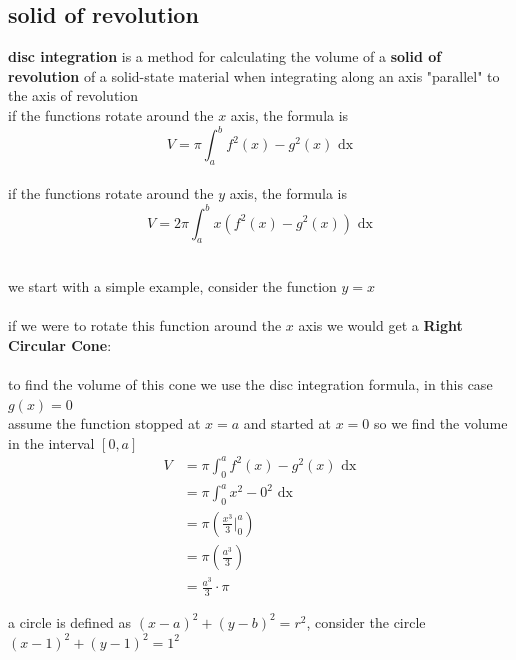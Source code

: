 \documentclass[a4paper,12pt]{article}
\newcommand{\?}{\stackrel{?}{=}}
\begin{document}
\subsection{solid of revolution}
\label{sec:org54164d2}
\begin{definition}
\textbf{disc integration} is a method for calculating the volume of a \textbf{solid of revolution} of a solid-state material when integrating along an axis "parallel" to the axis of revolution\\[0pt]
if the functions rotate around the \(x\) axis, the formula is\\[0pt]
\[
  V = \pi \int_a^b f^2(x) - g^2(x) \text{ dx}
\]\\[0pt]
if the functions rotate around the \(y\) axis, the formula is\\[0pt]
\[
  V = 2\pi \int_a^b x\left(f^2(x) - g^2(x)\right) \text{ dx}
\]\\[0pt]
\begin{my_example}
we start with a simple example, consider the function \(y = x\)\\[0pt]

\\[0pt]

if we were to rotate this function around the \(x\) axis we would get a \textbf{Right Circular Cone}:\\[0pt]

\\[0pt]

to find the volume of this cone we use the disc integration formula, in this case \(g(x)=0\)\\[0pt]
assume the function stopped at \(x=a\) and started at \(x=0\) so we find the volume in the interval \([0,a]\)\\[0pt]
\begin{align*}
  V &= \pi \int_0^a f^2(x) - g^2(x) \text{ dx}\\
  &= \pi \int_0^a x^2 - 0^2 \text{ dx}\\
  &= \pi\left(\frac{x^3}{3}\Big|_0^a\right)\\
  &= \pi\left(\frac{a^3}{3}\right)\\
  &= \frac{a^3}{3} \cdot \pi
\end{align*}
\end{my_example}

\begin{my_example}
a circle is defined as \({(x-a)}^2+{(y-b)}^2=r^2\), consider the circle \({(x-1)}^2+{(y-1)}^2=1^2\)\\[0pt]


\end{my_example}
\end{definition}
\end{document}
